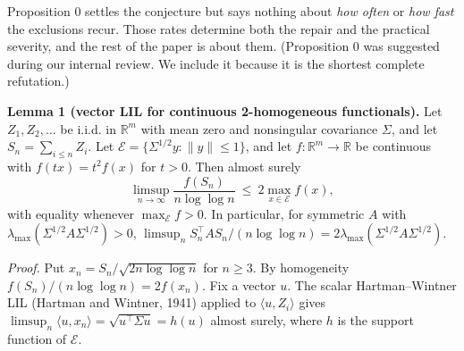 \documentclass[
  10pt,
  a4paper,
]{article}
\begin{document}
Proposition 0 settles the conjecture but says nothing about \emph{how
often} or \emph{how fast} the exclusions recur. Those rates determine
both the repair and the practical severity, and the rest of the paper is
about them. (Proposition 0 was suggested during our internal review. We
include it because it is the shortest complete refutation.)

\textbf{Lemma 1 (vector LIL for continuous 2-homogeneous functionals).}
Let \(Z_1,Z_2,\dots\) be i.i.d. in \(\mathbb R^m\) with mean zero and
nonsingular covariance \(\Sigma\), and let \(S_n=\sum_{i\le n}Z_i\). Let
\(\mathcal E=\{\Sigma^{1/2}y:\|y\|\le1\}\), and let
\(f:\mathbb R^m\to\mathbb R\) be continuous with \(f(tx)=t^2f(x)\) for
\(t>0\). Then almost surely \[
\limsup_{n\to\infty}\frac{f(S_n)}{n\log\log n}\ \le\ 2\max_{x\in\mathcal E}f(x),
\] with equality whenever \(\max_{\mathcal E}f>0\). In particular, for
symmetric \(A\) with \(\lambda_{\max}(\Sigma^{1/2}A\Sigma^{1/2})>0\),
\(\limsup_n S_n^\top AS_n/(n\log\log n)=2\lambda_{\max}(\Sigma^{1/2}A\Sigma^{1/2})\).

\emph{Proof.} Put \(x_n=S_n/\sqrt{2n\log\log n}\) for \(n\ge3\). By
homogeneity \(f(S_n)/(n\log\log n)=2f(x_n)\). Fix a vector \(u\). The
scalar Hartman--Wintner LIL (Hartman and Wintner, 1941) applied to
\(\langle u,Z_i\rangle\) gives
\(\limsup_n\langle u,x_n\rangle=\sqrt{u^\top\Sigma u}=h(u)\) almost
surely, where \(h\) is the support function of \(\mathcal E\).
\end{document}
